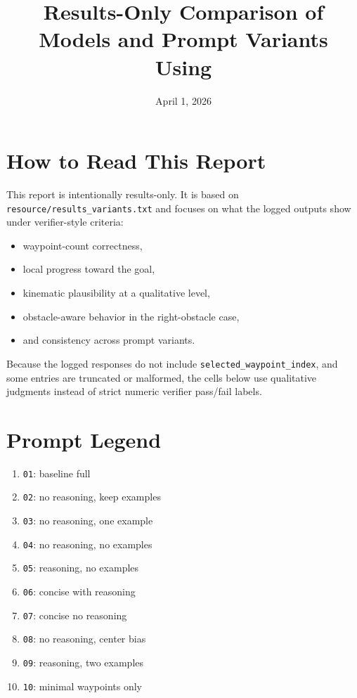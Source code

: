 \documentclass[10pt]{article}
\title{Results-Only Comparison of Models and Prompt Variants\\Using \code{resource/results\_variants.txt}}
\author{}
\date{April 1, 2026}
\newcommand{\code}[1]{\texttt{#1}}
\begin{document}
\maketitle

\section*{How to Read This Report}
This report is intentionally results-only. It is based on \code{resource/results\_variants.txt} and focuses on what the logged outputs show under verifier-style criteria:
\begin{itemize}
  \item waypoint-count correctness,
  \item local progress toward the goal,
  \item kinematic plausibility at a qualitative level,
  \item obstacle-aware behavior in the right-obstacle case,
  \item and consistency across prompt variants.
\end{itemize}

Because the logged responses do not include \code{selected\_waypoint\_index}, and some entries are truncated or malformed, the cells below use qualitative judgments instead of strict numeric verifier pass/fail labels.

\section*{Prompt Legend}
\begin{enumerate}
  \item \code{01}: baseline full
  \item \code{02}: no reasoning, keep examples
  \item \code{03}: no reasoning, one example
  \item \code{04}: no reasoning, no examples
  \item \code{05}: reasoning, no examples
  \item \code{06}: concise with reasoning
  \item \code{07}: concise no reasoning
  \item \code{08}: no reasoning, center bias
  \item \code{09}: reasoning, two examples
  \item \code{10}: minimal waypoints only
\end{enumerate}
\end{document}
